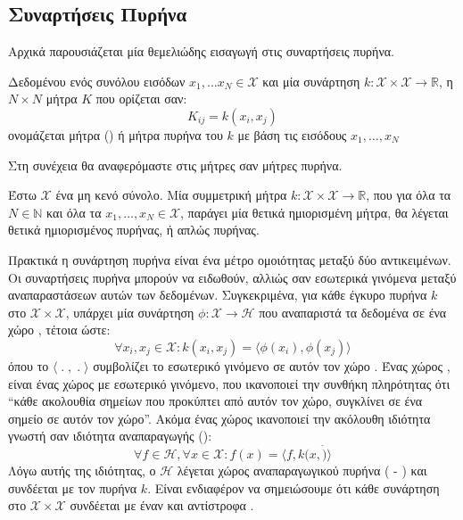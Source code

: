 \subsection{Συναρτήσεις Πυρήνα}
Αρχικά παρουσιάζεται μία θεμελιώδης εισαγωγή στις συναρτήσεις πυρήνα.
\begin{definition}
Δεδομένου ενός συνόλου εισόδων $x_{1}, \dots x_{N} \in \mathcal{X}$ και μία συνάρτηση $k:\mathcal{X}\times\mathcal{X}\rightarrow \mathbb{R}$, η $N \times N$ μήτρα $K$ που ορίζεται σαν:
$$K_{ij} = k(x_{i}, x_{j}) $$
ονομάζεται  μήτρα () ή μήτρα πυρήνα του $k$ με βάση τις εισόδους $x_{1}, \dots, x_{N}$
\label{def:kernel_matrix}
\end{definition}
Στη συνέχεια θα αναφερόμαστε στις μήτρες  σαν μήτρες πυρήνα.
\begin{definition}
Έστω $\mathcal{X}$ ένα μη κενό σύνολο.
Μία συμμετρική μήτρα $k:\mathcal{X} \times \mathcal{X} \rightarrow \mathbb{R}$, που για όλα τα $N \in \mathbb{N}$ και όλα τα $x_{1},\dots, x_{N} \in \mathcal{X}$, παράγει μία θετικά ημιορισμένη μήτρα, θα λέγεται θετικά ημιορισμένος πυρήνας, ή απλώς πυρήνας.
\label{def:psd_km}
\end{definition}
Πρακτικά η συνάρτηση πυρήνα είναι ένα μέτρο ομοιότητας μεταξύ δύο αντικειμένων.
Οι συναρτήσεις πυρήνα μπορούν να ειδωθούν, αλλιώς σαν εσωτερικά γινόμενα μεταξύ αναπαραστάσεων αυτών των δεδομένων.
Συγκεκριμένα, για κάθε έγκυρο πυρήνα $k$ στο $\mathcal{X}\times\mathcal{X}$, υπάρχει μία συνάρτηση $\phi: \mathcal{X} \rightarrow \mathcal{H}$ που αναπαριστά τα δεδομένα σε ένα χώρο , τέτοια ώστε:
\begin{equation}
\forall x_{i}, x_{j} \in \mathcal{X}: k(x_{i}, x_{j}) = \langle \phi(x_{i}), \phi(x_{j}) \rangle
\end{equation}
όπου το $\langle\;.\;,\;.\;\rangle$ συμβολίζει το εσωτερικό γινόμενο σε αυτόν τον χώρο .
Ένας χώρος , είναι ένας χώρος με εσωτερικό γινόμενο, που ικανοποιεί την συνθήκη πληρότητας ότι ``κάθε ακολουθία σημείων  που προκύπτει από αυτόν τον χώρο, συγκλίνει σε ένα σημείο σε αυτόν τον χώρο''. Ακόμα ένας χώρος  ικανοποιεί την ακόλουθη ιδιότητα γνωστή σαν ιδιότητα αναπαραγωγής ():
\begin{equation}
\forall f \in \mathcal{H}, \forall x \in \mathcal{X}: f(x)=\langle f, k(x,\dot)\rangle
\end{equation}
Λόγω αυτής της ιδιότητας, ο $\mathcal{H}$ λέγεται χώρος  αναπαραγωγικού πυρήνα ( - ) και συνδέεται με τον πυρήνα $k$.
Είναι ενδιαφέρον να σημειώσουμε ότι κάθε συνάρτηση στο $\mathcal{X} \times \mathcal{X}$ συνδέεται με έναν  και αντίστροφα \cite{Aronszajn1950}.

